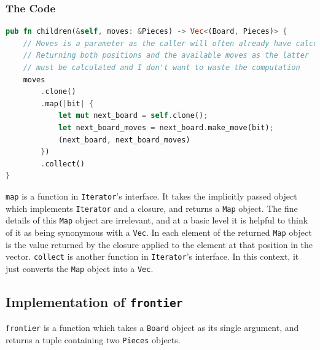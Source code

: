 \documentclass[12pt, a4paper]{report}
\begin{document}
\subsubsection{The Code}
\begin{lstlisting}[language=Rust]
pub fn children(&self, moves: &Pieces) -> Vec<(Board, Pieces)> {
    // Moves is a parameter as the caller will often already have calculated it
    // Returning both positions and the available moves as the latter
    // must be calculated and I don't want to waste the computation
    moves
        .clone()
        .map(|bit| {
            let mut next_board = self.clone();
            let next_board_moves = next_board.make_move(bit);
            (next_board, next_board_moves)
        })
        .collect()
}
\end{lstlisting}

\texttt{map} is a function in \texttt{Iterator}'s interface. It takes the implicitly passed object which implements \texttt{Iterator} and a closure, and returns a \texttt{Map} object. The fine details of this \texttt{Map} object are 
irrelevant, and at a basic level it is helpful to think of it as being synonymous with a \texttt{Vec}. In each element of the returned \texttt{Map} object is the value returned by the closure applied to the element at that position 
in the vector. \texttt{collect} is another function in \texttt{Iterator}'s interface. In this context, it just converts the \texttt{Map} object into a \texttt{Vec}.

\subsection{Implementation of \texttt{frontier}}
\texttt{frontier} is a function which takes a \texttt{Board} object as its single argument, and returns a tuple containing two \texttt{Pieces} objects.
\end{document}
